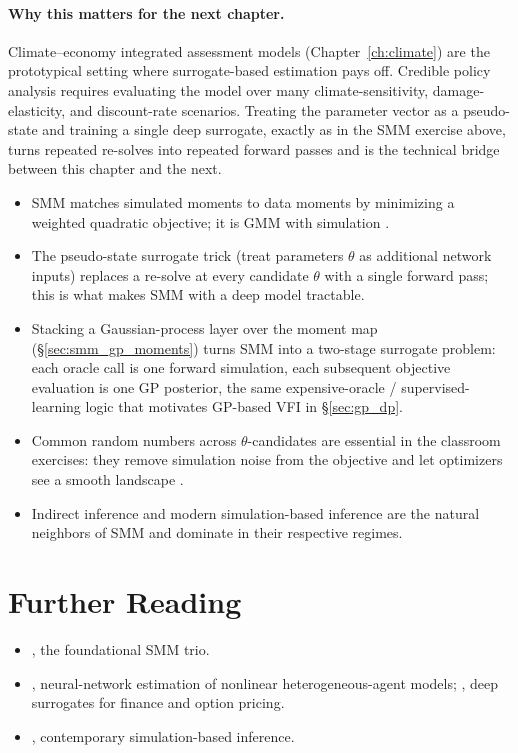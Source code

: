 \documentclass[11pt,a4paper]{report}
\begin{document}
\paragraph{Why this matters for the next chapter.}  Climate--economy integrated assessment models (Chapter~\ref{ch:climate}) are the prototypical setting where surrogate-based estimation pays off.  Credible policy analysis requires evaluating the model over many climate-sensitivity, damage-elasticity, and discount-rate scenarios.  Treating the parameter vector as a pseudo-state and training a single deep surrogate, exactly as in the SMM exercise above, turns repeated re-solves into repeated forward passes and is the technical bridge between this chapter and the next.

\begin{keyinsightbox}
\begin{itemize}[itemsep=2pt, leftmargin=*]
\item SMM matches simulated moments to data moments by minimizing a weighted quadratic objective; it is GMM with simulation \citep{mcfadden1989method, pakes1989simulation}.
\item The pseudo-state surrogate trick (treat parameters $\theta$ as additional network inputs) replaces a re-solve at every candidate $\theta$ with a single forward pass; this is what makes SMM with a deep model tractable.
\item Stacking a Gaussian-process layer over the moment map (\S\ref{sec:smm_gp_moments}) turns SMM into a two-stage surrogate problem: each oracle call is one forward simulation, each subsequent objective evaluation is one GP posterior, the same expensive-oracle / supervised-learning logic that motivates GP-based VFI in \S\ref{sec:gp_dp}.
\item Common random numbers across $\theta$-candidates are essential in the classroom exercises: they remove simulation noise from the objective and let optimizers see a smooth landscape \citep{glasserman2004monte}.
\item Indirect inference and modern simulation-based inference \citep{smith1993estimating, gourieroux1993indirect, cranmer2020frontier} are the natural neighbors of SMM and dominate in their respective regimes.
\end{itemize}
\end{keyinsightbox}

\section*{Further Reading}
\begin{itemize}[itemsep=2pt]
\item \citet{mcfadden1989method, pakes1989simulation, duffie1993simulated}, the foundational SMM trio.
\item \citet{kase2022estimating}, neural-network estimation of nonlinear heterogeneous-agent models; \citet{chen2025Deep}, deep surrogates for finance and option pricing.
\item \citet{cranmer2020frontier}, contemporary simulation-based inference.
\end{itemize}
\end{document}
